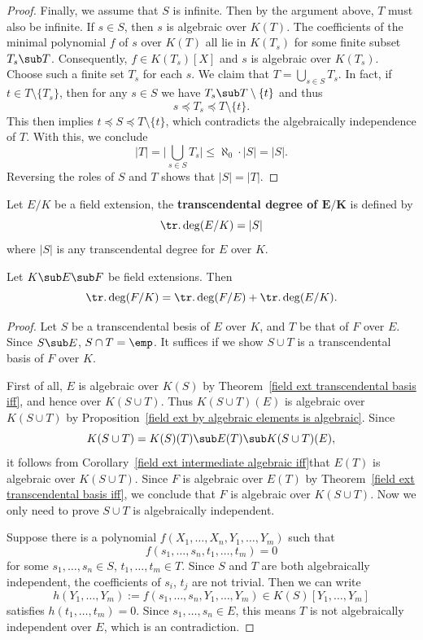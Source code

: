 \begin{proof}
Finally, we assume that $S$ is infinite. Then by the argument above, $T$ must also be infinite. If $s\in S$, then $s$ is algebraic over $K(T)$. The coefficients of the minimal polynomial $f$ of $s$ over $K(T)$ all lie in $K(T_s)$ for some finite subset $T_s\sub T$. Consequently, $f\in K(T_s)[X]$ and $s$ is algebraic over $K(T_s)$. Choose such a finite set $T_s$ for each $s$. We claim that $T=\bigcup_{s\in S}T_s$. In fact, if $t\in T\setminus\{T_s\}$, then for any $s\in S$ we have $T_s\sub T\setminus\{t\}$ and thus
\[s\preceq T_s\preceq T\setminus\{t\}.\]
This then implies $t\preceq S\preceq T\setminus\{t\}$, which contradicts the algebraically independence of $T$. With this, we conclude
\[|T|=\Big|\bigcup_{s\in S}T_s\Big|\leq\aleph_0\cdot|S|=|S|.\]
Reversing the roles of $S$ and $T$ shows that $|S|=|T|$.
\end{proof}
\begin{definition}
Let $E/K$ be a field extension, the \textbf{transcendental degree of $\bm{E/K}$} is defined by
\[\tr.\deg(E/K)=|S|\]
where $|S|$ is any transcendental degree for $E$ over $K$.
\end{definition}
\begin{proposition}\label{field transcendental degree additive}
Let $K\sub E\sub F$ be field extensions. Then
\[\tr.\deg(F/K)=\tr.\deg(F/E)+\tr.\deg(E/K).\]
\end{proposition}
\begin{proof}
Let $S$ be a transcendental besis of $E$ over $K$, and $T$ be that of $F$ over $E$. Since $S\sub E$, $S\cap T=\emp$. It suffices if we show $S\cup T$ is a transcendental basis of $F$ over $K$.\par
First of all, $E$ is algebraic over $K(S)$ by Theorem~\ref{field ext transcendental basis iff}, and hence over $K(S\cup T)$. Thus $K(S\cup T)(E)$ is algebraic over $K(S\cup T)$ by Proposition~\ref{field ext by algebraic elements is algebraic}. Since
\[K(S\cup T)=K(S)(T)\sub E(T)\sub K(S\cup T)(E),\]
it follows from Corollary~\ref{field ext intermediate algebraic iff}that $E(T)$ is algebraic over $K(S\cup T)$. Since $F$ is algebraic over $E(T)$ by Theorem~\ref{field ext transcendental basis iff}, we conclude that $F$ is algebraic over $K(S\cup T)$. Now we only need to prove $S\cup T$ is algebraically independent.\par
Suppose there is a polynomial $f(X_1,\dots,X_n,Y_1,\dots,Y_m)$ such that
\[f(s_1,\dots,s_n,t_1,\dots,t_m)=0\]
for some $s_1,\dots,s_n\in S$, $t_1,\dots,t_m\in T$. Since $S$ and $T$ are both algebraically independent, the coefficients of $s_i$, $t_j$ are not trivial. Then we can write
\[h(Y_1,\dots,Y_m):=f(s_1,\dots,s_n,Y_1,\dots,Y_m)\in K(S)[Y_1,\dots,Y_m]\]
satisfies $h(t_1,\dots,t_m)=0$. Since $s_1,\dots,s_n\in E$, this means $T$ is not algebraically independent over $E$, which is an contradiction.
\end{proof}

